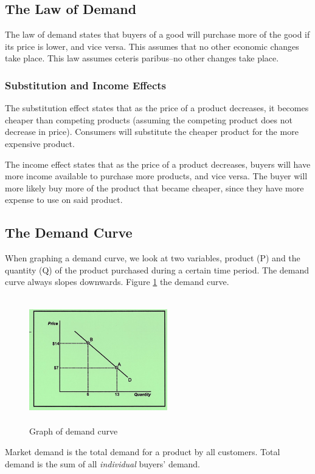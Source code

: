 \documentclass[a4paper, 12pt] {article}
\begin{document}
\subsection{The Law of Demand}
The law of demand states that buyers of a good will purchase more of the good
if its price is lower, and vice versa. This assumes that no other economic changes
take place. This law assumes ceteris paribus--no other changes take place.

\subsubsection{Substitution and Income Effects}
The substitution effect states that as the price of a product decreases, it
becomes cheaper than competing products (assuming the competing product does not
decrease in price). Consumers will substitute the cheaper product for the more
expensive product.

The income effect states that as the price of a product decreases, buyers will
have more income available to purchase more products, and vice versa. The buyer
will more likely buy more of the product that became cheaper, since they have
more expense to use on said product.

\subsection{The Demand Curve}
When graphing a demand curve, we look at two variables, product (P) and the
quantity (Q) of the product purchased during a certain time period. The demand
curve always slopes downwards. Figure \ref{fig:demand_curve} the demand curve.
\begin{figure}
    \centering
    \includegraphics[height=5.5cm, width=6cm]{demand_curve.jpg}
    \caption{Graph of demand curve}
    \label{fig:demand_curve}
\end{figure}

Market demand is the total demand for a product by all customers. Total demand
is the sum of all \emph{individual} buyers' demand.
\end{document}
